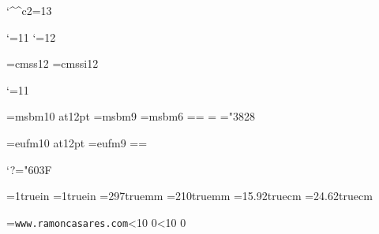 
\catcode`\^^c2=13
\ifx\index\undefined  \fi

\catcode`\@=11
\let\utf=\relax
\let\utf@Ch=\relax
\let\stringate=\relax
\let\dohigh=\relax
\let\doaccents=\relax
\let\dosymbols=\relax
\let\deactivate=\relax
\def\stringaccents{\def\'{\string\'}\def\~{\string\~}%
 \def\"{\string\"}\def\`{\string\`}\def\^{\string\^}}
\catcode`\@=12

\files


\ifx\loadfont\undefined  \fi
\xiifonts \xiititles \rm
\font\sf=cmss12
\font\sfit=cmssi12

\catcode`\@=11

\font\xiibb=msbm10 at12pt
\font\ixbb=msbm9
\font\vibb=msbm6
\newfam\bbfam %
\textfont\bbfam=\xiibb \scriptfont\bbfam=\ixbb
\scriptscriptfont\bbfam=\vibb
\def\bb{\fam\bbfam\xiibb}
\mathchardef\subsetneq="3828

\font\xiifrak=eufm10 at12pt
\font\ixfrak=eufm9
\newfam\frakfam \textfont\frakfam=\xiifrak \scriptfont\frakfam=\ixfrak
\def\frak{\fam\frakfam\xiifrak}

\mathcode`?="603F %
\def\ifmath$#1${\relax\ifmmode #1\else$#1$\fi}
\def\QED{\ifmath$\diamond$}




\ifcase\pdfoutput\else
 \pdfhorigin=1truein
 \pdfvorigin=1truein
 \pdfpageheight=297truemm
 \pdfpagewidth=210truemm
\fi
\hsize=15.92truecm \vsize=24.62truecm %
\advance\vsize -30pt

\def\twodigits#1{\ifnum #1<10 0\fi \number#1}
\def\todayiso{\number\year \twodigits\month \twodigits\day}
\def\Folio{\ifnum\pageno<0
 \uppercase\expandafter{\romannumeral-\pageno}\else\number\pageno\fi}

\headline={{\tt www.ramoncasares.com}\quad \todayiso \hfil
 \quad{\tt \jobname}\quad {\bf\Folio}}%
\def\makeheadline{\vbox to 30pt{\line{\the\headline}%
  \kern 1pt \hrule height 1pt\vfil}\nointerlineskip}
\nopagenumbers


\newcount\secno
\newcount\ssecno
\newcount\thno
\newcount\parno
\let\presec=\empty

\parskip=0pt
\newdimen\oldparindent \oldparindent=20pt \parindent=0pt
\def\hang{\hangindent\oldparindent}


